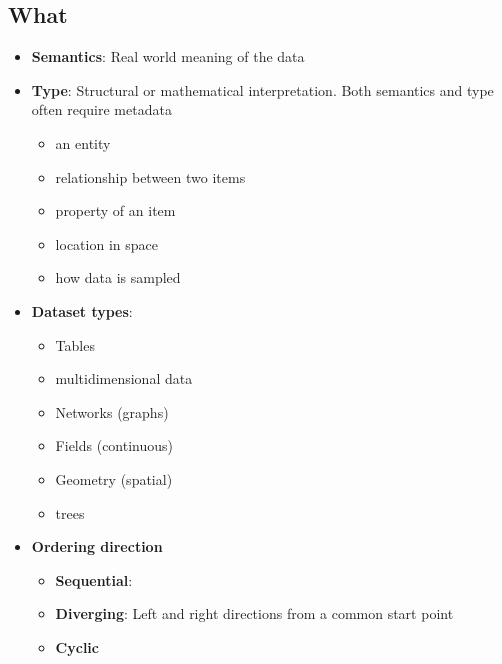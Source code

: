 \documentclass{report}
\begin{document}
    \subsection{What}
    \begin{itemize}
        \item \textbf{Semantics}: Real world meaning of the data
        \item \textbf{Type}: Structural or mathematical interpretation. Both semantics and type often require metadata
            \begin{itemize}
                \item {} an entity
                \item {} relationship between two items
                \item {} property of an item
                \item {} location in space
                \item {} how data is sampled
            \end{itemize}
        \item \textbf{Dataset types}: 
            \begin{itemize}
                \item Tables
                \item multidimensional data
                \item Networks (graphs)
                \item Fields (continuous)
                \item Geometry (spatial)
                \item trees
            \end{itemize}
        \item \textbf{Ordering direction}
            \begin{itemize}
                \item \textbf{Sequential}:
                \item \textbf{Diverging}: Left and right directions from a common start point
                \item \textbf{Cyclic}
            \end{itemize}
    \end{itemize}

    \pagebreak 
\end{document}
